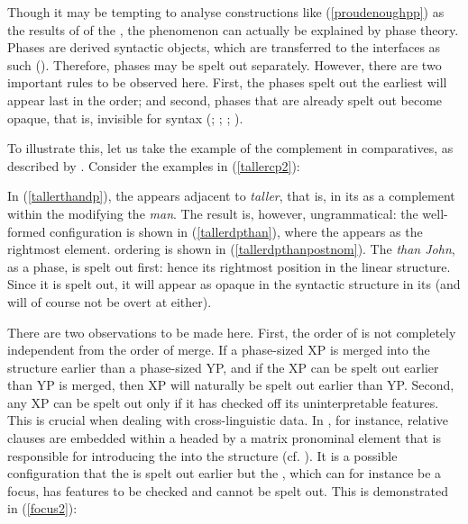 Though it may be tempting to analyse constructions like (\ref{proudenoughpp}) as the results of  of the , the phenomenon can actually be explained by phase theory. Phases are derived syntactic objects, which are transferred to the interfaces as such (\citealt[9]{chomsky2008}). Therefore, phases may be spelt out separately. However, there are two important rules to be observed here. First, the phases spelt out the earliest will appear last in the  order; and second, phases that are already spelt out become opaque, that is, invisible for syntax (\citealt{chomsky2001, chomsky2004, chomsky2008}; \citealt{nissenbaum2000diss}; \citealt{svenonius2004}; \citealt{kantor2008}).

To illustrate this, let us take the example of the  complement in comparatives, as described by \citet{kantor2008}. Consider the examples in (\ref{tallercp2}):

\ea \label{tallercp2}
 \label{tallerthandp}
 \label{tallerdpthan}
 \label{tallerdpthanpostnom}
\z
\z

In (\ref{tallerthandp}), the  appears adjacent to \textit{taller}, that is, in its  as a complement within the  modifying the  \textit{man}. The result is, however, ungrammatical: the well-formed configuration is shown in (\ref{tallerdpthan}), where the  appears as the rightmost element.  ordering is shown in (\ref{tallerdpthanpostnom}). The  \textit{than John}, as a phase, is spelt out first: hence its rightmost position in the linear structure. Since it is spelt out, it will appear as opaque in the syntactic structure in its  (and will of course not be overt at  either).

There are two observations to be made here. First, the order of  is not completely independent from the order of merge. If a phase-sized XP is merged into the structure earlier than a phase-sized YP, and if the XP can be spelt out earlier than YP is merged, then XP will naturally be spelt out earlier than YP. Second, any XP can be spelt out only if it has checked off its uninterpretable features. This is crucial when dealing with cross-linguistic data. In , for instance, relative clauses are embedded within a  headed by a matrix pronominal element that is responsible for introducing the  into the structure (cf. \citealt[243--248]{ekiss2002}). It is a possible configuration that the  is spelt out earlier but the , which can for instance be a focus, has features to be checked and cannot be spelt out. This is demonstrated in (\ref{focus2}):


